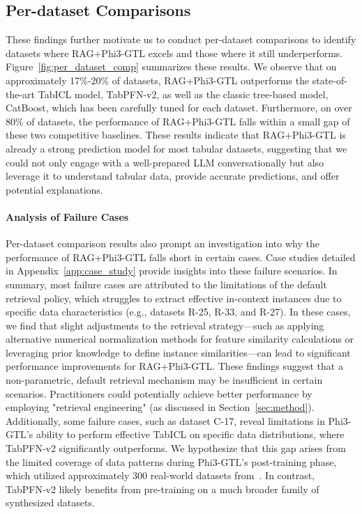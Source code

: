\subsection{Per-dataset Comparisons}
\label{sec:exp_per_ds_comp}

These findings further motivate us to conduct per-dataset comparisons to identify datasets where RAG+Phi3-GTL excels and those where it still underperforms.
Figure~\ref{fig:per_dataset_comp} summarizes these results.
We observe that on approximately 17\%-20\% of datasets, RAG+Phi3-GTL outperforms the state-of-the-art TabICL model, TabPFN-v2, as well as the classic tree-based model, CatBoost, which has been carefully tuned for each dataset.
Furthermore, on over 80\% of datasets, the performance of RAG+Phi3-GTL falls within a small gap of these two competitive baselines.
These results indicate that RAG+Phi3-GTL is already a strong prediction model for most tabular datasets, suggesting that we could not only engage with a well-prepared LLM conversationally but also leverage it to understand tabular data, provide accurate predictions, and offer potential explanations.


\paragraph{Analysis of Failure Cases}
Per-dataset comparison results also prompt an investigation into why the performance of RAG+Phi3-GTL falls short in certain cases. Case studies detailed in Appendix~\ref{app:case_study} provide insights into these failure scenarios.
In summary, most failure cases are attributed to the limitations of the default retrieval policy, which struggles to extract effective in-context instances due to specific data characteristics (e.g., datasets R-25, R-33, and R-27). In these cases, we find that slight adjustments to the retrieval strategy—such as applying alternative numerical normalization methods for feature similarity calculations or leveraging prior knowledge to define instance similarities—can lead to significant performance improvements for RAG+Phi3-GTL.
These findings suggest that a non-parametric, default retrieval mechanism may be insufficient in certain scenarios. Practitioners could potentially achieve better performance by employing "retrieval engineering" (as discussed in Section~\ref{sec:method}).
Additionally, some failure cases, such as dataset C-17, reveal limitations in Phi3-GTL’s ability to perform effective TabICL on specific data distributions, where TabPFN-v2 significantly outperforms. We hypothesize that this gap arises from the limited coverage of data patterns during Phi3-GTL’s post-training phase, which utilized approximately 300 real-world datasets from~\citeauthor{wen2024GTL}. In contrast, TabPFN-v2 likely benefits from pre-training on a much broader family of synthesized datasets.


